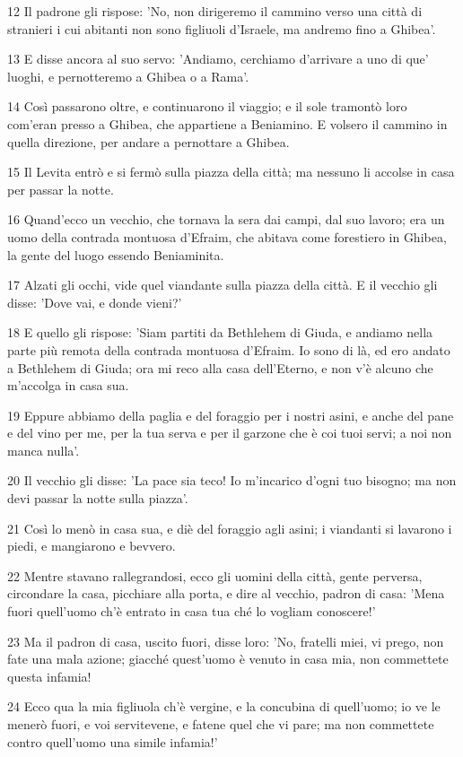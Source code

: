 \par 12 Il padrone gli rispose: 'No, non dirigeremo il cammino verso una città di stranieri i cui abitanti non sono figliuoli d'Israele, ma andremo fino a Ghibea'.
\par 13 E disse ancora al suo servo: 'Andiamo, cerchiamo d'arrivare a uno di que' luoghi, e pernotteremo a Ghibea o a Rama'.
\par 14 Così passarono oltre, e continuarono il viaggio; e il sole tramontò loro com'eran presso a Ghibea, che appartiene a Beniamino. E volsero il cammino in quella direzione, per andare a pernottare a Ghibea.
\par 15 Il Levita entrò e si fermò sulla piazza della città; ma nessuno li accolse in casa per passar la notte.
\par 16 Quand'ecco un vecchio, che tornava la sera dai campi, dal suo lavoro; era un uomo della contrada montuosa d'Efraim, che abitava come forestiero in Ghibea, la gente del luogo essendo Beniaminita.
\par 17 Alzati gli occhi, vide quel viandante sulla piazza della città. E il vecchio gli disse: 'Dove vai, e donde vieni?'
\par 18 E quello gli rispose: 'Siam partiti da Bethlehem di Giuda, e andiamo nella parte più remota della contrada montuosa d'Efraim. Io sono di là, ed ero andato a Bethlehem di Giuda; ora mi reco alla casa dell'Eterno, e non v'è alcuno che m'accolga in casa sua.
\par 19 Eppure abbiamo della paglia e del foraggio per i nostri asini, e anche del pane e del vino per me, per la tua serva e per il garzone che è coi tuoi servi; a noi non manca nulla'.
\par 20 Il vecchio gli disse: 'La pace sia teco! Io m'incarico d'ogni tuo bisogno; ma non devi passar la notte sulla piazza'.
\par 21 Così lo menò in casa sua, e diè del foraggio agli asini; i viandanti si lavarono i piedi, e mangiarono e bevvero.
\par 22 Mentre stavano rallegrandosi, ecco gli uomini della città, gente perversa, circondare la casa, picchiare alla porta, e dire al vecchio, padron di casa: 'Mena fuori quell'uomo ch'è entrato in casa tua ché lo vogliam conoscere!'
\par 23 Ma il padron di casa, uscito fuori, disse loro: 'No, fratelli miei, vi prego, non fate una mala azione; giacché quest'uomo è venuto in casa mia, non commettete questa infamia!
\par 24 Ecco qua la mia figliuola ch'è vergine, e la concubina di quell'uomo; io ve le menerò fuori, e voi servitevene, e fatene quel che vi pare; ma non commettete contro quell'uomo una simile infamia!'
